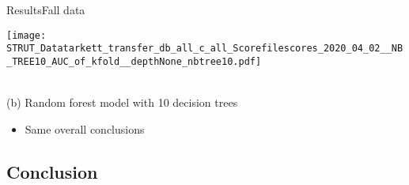 \begin{frame}{Results}{Fall data}
\begin{minipage}[t]{0.49\linewidth}
        \begin{minipage}[t]{\ratio\linewidth}\vspace{0cm}
        \centerline{\texttt{[image: STRUT\_Datatarkett\_transfer\_db\_all\_c\_all\_Scorefilescores\_2020\_04\_02\_\_NB\_TREE10\_AUC\_of\_kfold\_\_depthNone\_nbtree10.pdf]}}
        \end{minipage}\\
        {\small(b)\; Random forest model with 10 decision trees}
        \begin{minipage}[t]{0.9\linewidth}\vspace{0pt}
            \begin{itemize}
                \item Same overall conclusions
            \end{itemize}
        \end{minipage}
    \end{minipage}

\end{frame}

\subsection{Conclusion}

